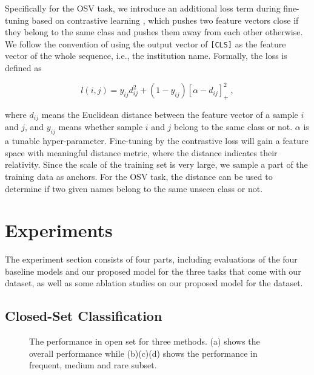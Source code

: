 \documentclass{article}
\begin{document}
Specifically for the OSV task, we introduce an additional loss term during fine-tuning based on contrastive learning \cite{hadsell2006dimensionality}, which pushes two feature vectors close if they belong to the same class and pushes them away from each other otherwise. We follow the convention of using the output vector of \texttt{[CLS]} as the feature vector of the whole sequence, i.e., the institution name. Formally, the loss is defined as

\begin{equation}
  \label{eq:contrastive}
  l(i, j) = y_{ij} d_{ij}^2 + (1-y_{ij}) [\alpha - d_{ij}]_+^2~,
\end{equation}

where $d_{ij}$ means the Euclidean distance between the feature vector of a sample $i$ and $j$, and $y_{ij}$ means whether sample $i$ and $j$ belong to the same class or not. $\alpha$ is a tunable hyper-parameter. Fine-tuning by the contrastive loss will gain a feature space with meaningful distance metric, where the distance indicates their relativity. 
Since the scale of the training set is very large, we sample a part of the training data as anchors. For the OSV task, the distance can be used to determine if two given names belong to the same unseen class or not. 

\section{Experiments}
The experiment section consists of four parts, including evaluations of the four baseline models and our proposed model for the three tasks that come with our dataset, as well as some ablation studies on our proposed model for the dataset. 
\subsection{Closed-Set Classification}

\begin{figure*} [ht]
	\centering 
	\centering
	\caption{ The performance in open set for three methods. (a) shows the overall performance while (b)(c)(d) shows the performance in frequent, medium and rare subset.} 
	\label{fig:osc_result} 
\end{figure*} 
\end{document}
